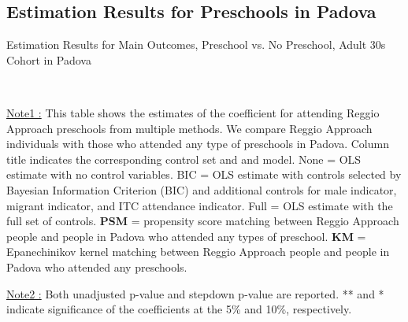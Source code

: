 \subsection{Estimation Results for Preschools in Padova} \label{subsection:padova-estimation}


\begin{table}[H] \caption{Estimation Results for Main Outcomes, Preschool vs. No Preschool, Adult 30s Cohort in Padova} \label{ols-M-adult30-reg-pres-padova}
\scalebox{0.62}{}
\vspace{1ex} \\
\footnotesize\raggedright{\underline{Note1 :} This table shows the estimates of the coefficient for attending Reggio Approach preschools from multiple methods. We compare Reggio Approach individuals with those who attended any type of preschools in Padova. Column title indicates the corresponding control set and and model. None = OLS estimate with no control variables. BIC = OLS estimate with controls selected by Bayesian Information Criterion (BIC) and additional controls for male indicator, migrant indicator, and ITC attendance indicator. Full = OLS estimate with the full set of controls. \textbf{PSM} =  propensity score matching between Reggio Approach people and people in Padova who attended any types of preschool. \textbf{KM} = Epanechinikov kernel matching between Reggio Approach people and people in Padova who attended any preschools.}

\footnotesize\raggedright{\underline{Note2 :} Both unadjusted p-value and stepdown p-value are reported. ** and * indicate significance of the coefficients at the 5\% and 10\%, respectively.}
\end{table}




